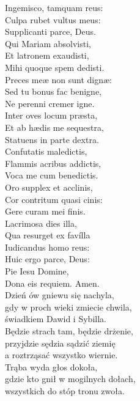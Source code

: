 \documentclass[10pt,a5paper]{mszalik}
\begin{document}
{Ingemisco, tamquam reus:\\
Culpa rubet vultus meus:\\
Supplicanti parce, Deus.\\

Qui Mariam absolvisti,\\
Et latronem exaudisti,\\
Mihi quoque spem dedisti.\\

Preces meæ non sunt dignæ:\\
Sed tu bonus fac benigne,\\
Ne perenni cremer igne.\\

Inter oves locum præsta,\\
Et ab hædis me sequestra,\\
Statuens in parte dextra.\\

Confutatis maledictis,\\
Flammis acribus addictis,\\
Voca me cum benedictis.\\

Oro supplex et acclinis,\\
Cor contritum quasi cinis:\\
Gere curam mei finis.\\

Lacrimosa dies illa,\\
Qua resurget ex favílla\\
Iudicandus homo reus:\\
Huic ergo parce, Deus:\\

Pie Iesu Domine,\\
Dona eis requiem. Amen.\\
}{
Dzień ów gniewu się nachyla,\\
gdy w proch wieki zmiecie chwila,\\
świadkiem Dawid i Sybilla.\\

Będzie strach tam, będzie drżenie,\\
przyjdzie sędzia sądzić ziemię\\
a roztrząsać wszystko wiernie.\\

Trąba wyda głos dokoła,\\
gdzie kto gnił w mogilnych dołach,\\
wszystkich do stóp tronu zwoła.\\

}
\end{document}
